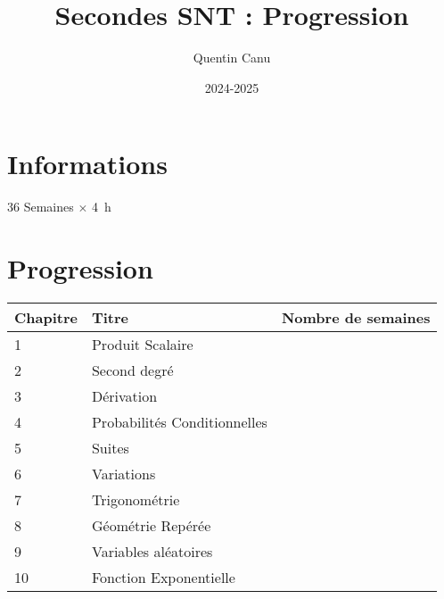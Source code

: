 \documentclass{article}
\title{Secondes SNT : Progression}
\author{Quentin Canu}
\date{2024-2025}
\begin{document}
\maketitle

\section{Informations}

36 Semaines $\times$ \qty{4}{\hour}

\section{Progression}

\begin{center}
    
\begin{tabular}{|l|p{4cm}|p{2cm}|}
\hline
Chapitre
    & 
Titre
        & 
Nombre de semaines\\
\hline
1   &
Produit Scalaire
        &
\\
\hline
2   &
Second degré
        &
\\
\hline
3   &
Dérivation
        &
\\
\hline
4   &
Probabilités Conditionnelles
        &
\\
\hline
5   &
Suites
        &
\\
\hline
6   &
Variations
        &
\\
\hline
7   &
Trigonométrie
        &
\\
\hline
8   &
Géométrie Repérée
        &
\\
\hline
9   &
Variables aléatoires
        &
\\
\hline
10  &
Fonction Exponentielle
        &
\\
\hline
\end{tabular}
\end{center}
\end{document}

